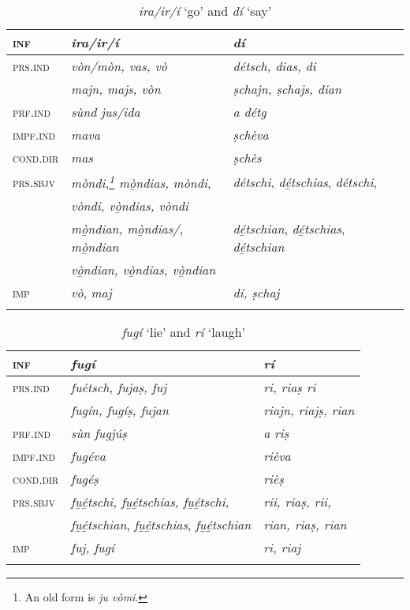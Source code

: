 \begin{table}
	\caption{\textit{ira/ir/í} `go' and \textit{dí} `say'}

	\begin{tabular}{llll}
		\lsptoprule
		\textsc{inf} & \textbf{\textit{ira/ir/í}} & \textbf{\textit{dí}}\\
		\midrule
		\textsc{prs.ind} & \textit{vòn/mòn, vas, vò} & \textit{détsch, dias, di} \\
		& \textit{majn, majs, vòn} & \textit{ṣchajn, ṣchajs, dian}\\
		\textsc{prf.ind} & \textit{sùnd jus/ida} & \textit{a détg}\\
		\textsc{impf.ind} & \textit{mava} & \textit{ṣchèva}\\
		\textsc{cond.dir} & \textit{mas} & \textit{ṣchès}\\
		\textsc{prs.sbjv} & \textit{mòndi,\footnote{An old form is \textit{ju vòmi}.} mò̱ndias, mòndi}, & \textit{détschi}, \textit{dé̱tschias}, \textit{détschi},\\
&	\textit{vòndi, vò̱ndias, vòndi}\\
		& \textit{mò̱ndian, mò̱ndias/, mò̱ndian} & \textit{dé̱tschian}, \textit{dé̱tschias}, \textit{dé̱tschian} \\
	&	\textit{vò̱ndian, vò̱ndias, vò̱ndian}\\
		\textsc{imp} & \textit{vò}, \textit{maj} & \textit{dí, ṣchaj}\\
		\lspbottomrule
	\end{tabular}
\end{table}


\begin{table}
	\caption{\textit{fugí} `lie' and \textit{rí} `laugh'}

	\begin{tabular}{lll}
		\lsptoprule
		\textsc{inf} & \textbf{\textit{fugí}} & \textbf{\textit{rí}}\\
		\midrule
		\textsc{prs.ind} & \textit{fuétsch, fujaṣ, fuj} & \textit{ri, riaṣ ri}\\
		&  \textit{fugín, fugíṣ, fujan} & \textit{riajn, riajṣ, rian}\\
		\textsc{prf.ind} & \textit{sùn fugjúṣ} & \textit{a riṣ}\\
		\textsc{impf.ind} & \textit{fugéva} & \textit{rièva}\\
		\textsc{cond.dir} & \textit{fugéṣ} & \textit{rièṣ}\\
		\textsc{prs.sbjv} & \textit{fu̱é̱tschi, fu̱é̱tschias, fu̱é̱tschi,} & \textit{rii, riaṣ, rii,}\\
		& \textit{fu̱é̱tschian}, \textit{fu̱é̱tschias}, \textit{fu̱é̱tschian} & \textit{rian, riaṣ, rian}\\
		\textsc{imp} & \textit{fuj, fugí} & \textit{ri, riaj}\\
		\lspbottomrule
	\end{tabular}
\end{table}


